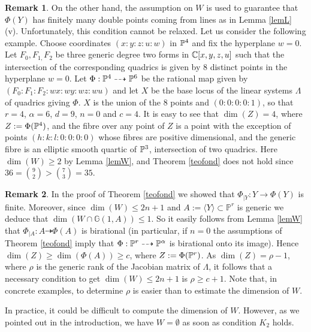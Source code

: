 \documentclass{amsart}
\theoremstyle{definition}
\newtheorem{remark}{Remark}
\begin{document}
\begin{remark}\label{remW}
On the other hand, the assumption on $W$ is used to guarantee that
$\Phi(Y)$ has finitely many double points coming from lines as in
Lemma \ref{lemL} (v). Unfortunately, this condition cannot be
relaxed. Let us consider the following example. Choose coordinates
$(x:y:z:u:w)$ in $\Bbb{P}^{4}$ and fix the hyperplane $w=0.$ Let
$F_{0},F_{1,}F_{2}$ be three generic degree two forms in
$\Bbb{C}[x,y,z,u]$ such that the intersection of the corresponding
quadrics is given by $8$ distinct points in the hyperplane $w=0 $.
Let $\Phi :\Bbb{P}^{4}\dasharrow \Bbb{P}^{6}$ be the rational map
given by $(F_{0}:F_{1}:F_{2}:wx:wy:wz:wu)$ and let $X$ be the base
locus of the linear systems $\Lambda $ of quadrics giving $\Phi$.
$X$ is the union of the $8$ points and $(0:0:0:0:1)$, so that $r=4$,
$\alpha =6$, $d=9$, $n=0$ and $c=4$. It is easy to see that $\dim
(Z)=4$, where $Z:=\Phi(\Bbb{P}^{4})$, and the fibre over any point
of $Z$ is a point with the exception of points $(h:k:l:0:0:0:0)$
whose fibres are positive dimensional, and the generic fibre is an
elliptic smooth quartic of $\Bbb{P}^{3}$, intersection of two
quadrics. Here $\dim (W)\geq 2$ by Lemma \ref{lemW}, and Theorem
\ref{teofond} does not hold since $36=\binom{9}{2}>\binom{7}{3}=35$.
\end{remark}

\begin{remark}
\label{remZ} In the proof of Theorem \ref{teofond} we showed that
$\Phi_{|Y}:Y\to\Phi(Y)$ is finite. Moreover, since $\dim(W)\leq
2n+1$ and $A:=\langle Y \rangle\subset{{\mathbb P}}^r$ is generic we deduce
that $\dim(W\cap{{\mathbb G}}(1,A))\leq 1$. So it easily follows from Lemma
\ref{lemW} that $\Phi_{|A}:A\dashrightarrow\Phi(A)$ is birational
(in particular, if $n=0$ the assumptions of Theorem \ref{teofond}
imply that $\Phi:\Bbb P^r\dashrightarrow\Bbb P^{\alpha}$ is
birational onto its image). Hence $\dim(Z)\geq\dim(\Phi(A))\geq c$,
where $Z:=\Phi(\Bbb P^r)$. As $\dim(Z)=\rho-1$, where $\rho$ is the
generic rank of the Jacobian matrix of $\Lambda$, it follows that a
necessary condition to get $\dim(W)\leq 2n+1$ is $\rho\geq c+1$.
Note that, in concrete examples, to determine $\rho$ is easier than
to estimate the dimension of $W$.

\end{remark}

In practice, it could be difficult to compute the dimension of $W$.
However, as we pointed out in the introduction, we have
$W=\emptyset$ as soon as condition $K_2$ holds.
\end{document}
